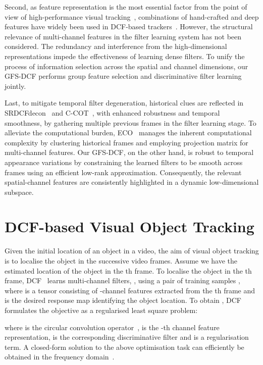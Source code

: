 \documentclass[10pt,twocolumn,letterpaper]{article}
\begin{document}
Second, as feature representation is the most essential factor from the point of view of high-performance visual tracking~\cite{wang2015understanding}, combinations of hand-crafted and deep features have widely been used in DCF-based trackers~\cite{Danelljan2014Adaptive,Henriques2015High,bhat2018unveiling}. However, the structural relevance of multi-channel features in the filter learning system has not been considered. 
The redundancy and interference from the high-dimensional representations impede the effectiveness of learning dense filters.
To unify the process of information selection across the spatial and channel dimensions, our GFS-DCF performs group feature selection and discriminative filter learning jointly. 

Last, to mitigate temporal filter degeneration, historical clues are reflected in SRDCFdecon~\cite{danelljan2016adaptive} and C-COT~\cite{Danelljan2016Beyond}, with enhanced robustness and temporal smoothness, by gathering multiple previous frames in the filter learning stage. 
To alleviate the computational burden, ECO~\cite{Danelljan2016ECO} manages the inherent computational complexity by clustering historical frames and employing projection matrix for multi-channel features. 
Our GFS-DCF, on the other hand, is robust to temporal appearance variations by constraining the learned filters to be smooth across frames using an efficient low-rank approximation.
Consequently, the relevant spatial-channel features are consistently highlighted in a dynamic low-dimensional subspace. 

\section{DCF-based Visual Object Tracking}
Given the initial location of an object in a video, the aim of visual object tracking is to localise the object in the successive video frames.
Assume we have the estimated location of the object in the th frame. To localise the object in the th frame, DCF~\cite{Henriques2015High} learns multi-channel filters, , using a pair of training samples , where  is a tensor consisting of -channel features extracted from the th frame and  is the desired response map identifying the object location. 
To obtain , DCF formulates the objective as a regularised least square problem:

where  is the circular convolution operator~\cite{Henriques2012Exploiting},
 is the -th channel feature representation,  is the corresponding discriminative filter and  is a regularisation term.
A closed-form solution to the above optimisation task can efficiently be obtained in the frequency domain~\cite{Henriques2015High}.
\end{document}
